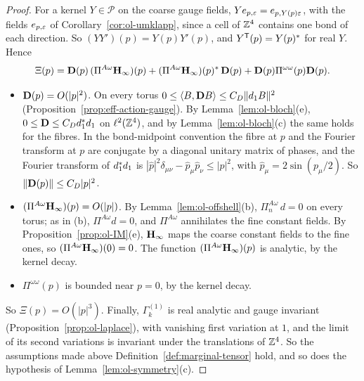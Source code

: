 \begin{proof}
For a kernel $Y\in\mathscr P$ on the coarse gauge fields, $Ye_{p,\varepsilon}=e_{p,Y(p)\varepsilon}$, with the fields $e_{p,\varepsilon}$ of Corollary~\ref{cor:ol-umklapp}, since a cell of $\mathbb Z^4$ contains one bond of each direction. So $(YY')(p)=Y(p)Y'(p)$, and $Y^{\sf T}(p)=Y(p)^*$ for real $Y$. Hence
\[
\Xi(p)=\mathbf D(p)\,(\Pi^{A\omega}\mathbf H_\infty)(p)+(\Pi^{A\omega}\mathbf H_\infty)(p)^*\,\mathbf D(p)+\mathbf D(p)\Pi^{\omega\omega}(p)\mathbf D(p).
\]
\begin{itemize}
\item $\mathbf D(p)=O(|p|^2)$. On every torus $0\le\langle B,\mathbf D B\rangle\le C_D\|d_1 B\|^2$ (Proposition~\ref{prop:eff-action-gauge}). By Lemma~\ref{lem:ol-bloch}(e), $0\le\mathbf D\le C_Dd_1^*d_1$ on $\ell^2(\mathbb Z^4)$, and by Lemma~\ref{lem:ol-bloch}(c) the same holds for the fibres. In the bond-midpoint convention the fibre at $p$ and the Fourier transform at $p$ are conjugate by a diagonal unitary matrix of phases, and the Fourier transform of $d_1^*d_1$ is $|\hat p|^2\delta_{\mu\nu}-\hat p_\mu\hat p_\nu\le|p|^2$, with $\hat p_\mu=2\sin(p_\mu/2)$. So $\|\mathbf D(p)\|\le C_D|p|^2$.
\item $(\Pi^{A\omega}\mathbf H_\infty)(p)=O(|p|)$. By Lemma~\ref{lem:ol-offshell}(b), $\Pi^{A\omega}_n\,d=0$ on every torus; as in (b), $\Pi^{A\omega}d=0$, and $\Pi^{A\omega}$ annihilates the fine constant fields. By Proposition~\ref{prop:ol-IM}(e), $\mathbf H_\infty$ maps the coarse constant fields to the fine ones, so $(\Pi^{A\omega}\mathbf H_\infty)(0)=0$. The function $(\Pi^{A\omega}\mathbf H_\infty)(p)$ is analytic, by the kernel decay.
\item $\Pi^{\omega\omega}(p)$ is bounded near $p=0$, by the kernel decay.
\end{itemize}
So $\Xi(p)=O(|p|^3)$. Finally, $\Gamma^{(1)}_k$ is real analytic and gauge invariant (Proposition~\ref{prop:ol-laplace}), with vanishing first variation at $1$, and the limit of its second variations is invariant under the translations of $\mathbb Z^4$. So the assumptions made above Definition~\ref{def:marginal-tensor} hold, and so does the hypothesis of Lemma~\ref{lem:ol-symmetry}(c).
\end{proof}

